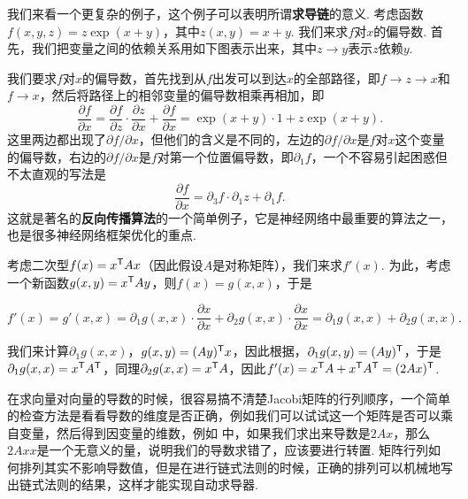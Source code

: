 \begin{example}
我们来看一个更复杂的例子，这个例子可以表明所谓\textbf{求导链}的意义. 考虑函数$f(x,y,z)=z\exp(x+y)$，其中$z(x,y)=x+y$. 我们来求$f$对$x$的偏导数. 首先，我们把变量之间的依赖关系用如下图表示出来，其中$z\to y$表示$z$依赖$y$.
\begin{center}
\end{center}
我们要求$f$对$x$的偏导数，首先找到从$f$出发可以到达$x$的全部路径，即$f\to z\to x$和$f\to x$，然后将路径上的相邻变量的偏导数相乘再相加，即
\[\frac{\partial f}{\partial x}=\frac{\partial f}{\partial z}\cdot\frac{\partial z}{\partial x}+\frac{\partial f}{\partial x}=\exp(x+y)\cdot 1+z\exp(x+y).\]
这里两边都出现了$\partial f/\partial x$，但他们的含义是不同的，左边的$\partial f/\partial x$是$f$对$x$这个变量的偏导数，右边的$\partial f/\partial x$是$f$对第一个位置偏导数，即$\partial_1 f$，一个不容易引起困惑但不太直观的写法是
\[\frac{\partial f}{\partial x}=\partial_3 f\cdot\partial_1 z+\partial_1 f.\]
这就是著名的\textbf{反向传播算法}的一个简单例子，它是神经网络中最重要的算法之一，也是很多神经网络框架优化的重点. 
\end{example}

\begin{example}\label{ex:quadratic-derivative}
考虑二次型$f(x)=x^{\mathsf{T}} A x$（因此假设$A$是对称矩阵），我们来求$f'(x)$. 为此，考虑一个新函数$g(x,y)=x^{\mathsf{T}} A y$，则$f(x)=g(x,x)$，于是

\[f'(x)=g'(x,x)=\partial_1 g(x,x)\cdot\frac{\partial x}{\partial x}+\partial_2 g(x,x)\cdot\frac{\partial x}{\partial x}=\partial_1 g(x,x)+\partial_2 g(x,x).\]

我们来计算$\partial_1 g(x,x)$，$g(x,y)=(Ay)^{\mathsf{T}} x$，因此根据，$\partial_1 g(x,y)=(Ay)^{\mathsf{T}}$，于是$\partial_1 g(x,x)=x^{\mathsf{T}} A^{\mathsf{T}}$，同理$\partial_2 g(x,x)=x^{\mathsf{T}} A$，因此$f'(x)=x^{\mathsf{T}} A+x^{\mathsf{T}} A^{\mathsf{T}}=(2Ax)^{\mathsf{T}}$.
\end{example}

\begin{remark}
在求向量对向量的导数的时候，很容易搞不清楚Jacobi矩阵的行列顺序，一个简单的检查方法是看看导数的维度是否正确，例如我们可以试试这一个矩阵是否可以乘自变量，然后得到因变量的维数，例如 中，如果我们求出来导数是$2Ax$，那么$2Axx$是一个无意义的量，说明我们的导数求错了，应该要进行转置. 矩阵行列如何排列其实不影响导数值，但是在进行链式法则的时候，正确的排列可以机械地写出链式法则的结果，这样才能实现自动求导器. 
\end{remark}


